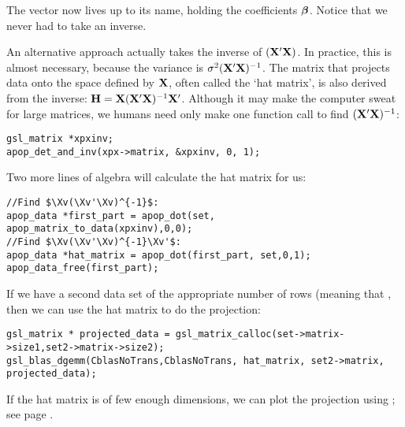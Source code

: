 The vector  now lives up to its name, holding the coefficients
${\mbox{\boldmath$\beta$}}$. Notice that we never had to take an inverse.  

An alternative approach actually takes the inverse of $({\bf X}'{\bf X})$. In practice, this is
almost necessary, because the variance is $\sigma^2 ({\bf X}'{\bf X})^{-1}$.
The matrix that projects data onto the space defined by ${\bf X}$,
often called the `hat matrix', is also derived from the inverse: ${\bf H} = {\bf X}({\bf X}'{\bf X})^{-1}{\bf X}'$. Although it may
make the computer sweat for large matrices, we humans need only make one
function call to find $({\bf X}'{\bf X})^{-1}$:
\begin{lstlisting}
gsl_matrix *xpxinv;
apop_det_and_inv(xpx->matrix, &xpxinv, 0, 1);
\end{lstlisting}
Two more lines of algebra will calculate the hat matrix for us: 
\lstset{texcl=true}
\begin{lstlisting}
//Find $\Xv(\Xv'\Xv)^{-1}$:
apop_data *first_part = apop_dot(set, apop_matrix_to_data(xpxinv),0,0);
//Find $\Xv(\Xv'\Xv)^{-1}\Xv'$:
apop_data *hat_matrix = apop_dot(first_part, set,0,1);
apop_data_free(first_part);
\end{lstlisting}
\lstset{texcl=false} %

If we have a second data set  of the appropriate number of
rows (meaning that , then we can use the hat matrix to do the projection:\\
\begin{lstlisting}
gsl_matrix * projected_data = gsl_matrix_calloc(set->matrix->size1,set2->matrix->size2);
gsl_blas_dgemm(CblasNoTrans,CblasNoTrans, hat_matrix, set2->matrix, projected_data);
\end{lstlisting}
If the hat matrix is of few enough dimensions, we can plot the
projection using ; see page \pageref{gnuprint}.


